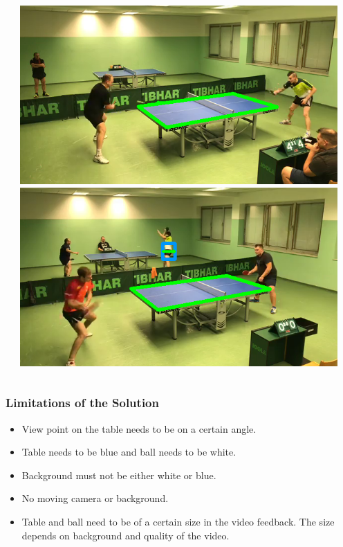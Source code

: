 \documentclass{beamer}
\begin{document}
\begin{frame}
\begin{columns}[onlytextwidth]
\begin{column}{0.5\textwidth}
		\end{column}
		\begin{column}{0.5\textwidth}
			\begin{center}
			\includegraphics[width=0.95\textwidth]{wrong3}\\
			\includegraphics[width=0.95\textwidth]{wrong4}\\
			\end{center}
		\end{column}
	\end{columns}\end{frame}

\begin{frame}
	\frametitle{Limitations of the Solution}
	\begin{itemize}
		\item View point on the table needs to be on a certain angle.
		\item Table needs to be blue and ball needs to be white. 
		\item Background must not be either white or blue.
		\item No moving camera or background.
		\item Table and ball need to be of a certain size in the video feedback. The size depends on background and quality of the video.
	\end{itemize}
\end{frame}
\end{document}
